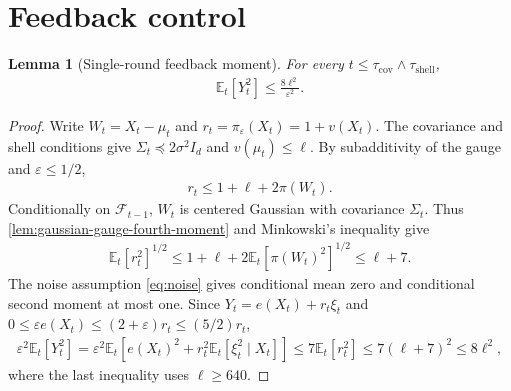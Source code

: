 \documentclass{article}
\newtheorem{lemma}[lemma]{Lemma}
\newcommand{\E}{\mathbb E}
\newcommand{\F}{\mathcal F}
\newcommand{\1}{\mathbf 1}
\newcommand{\eps}{\varepsilon}
\begin{document}
\section{Feedback control}
\label{app:feedback}
\begin{lemma}[Single-round feedback moment]
    \label{lem:single-round-feedback}
    For every $t\leq\tau_{\mathrm{cov}}\wedge\tau_{\mathrm{shell}}$,
    \begin{align}
        \E_t[Y_t^2]\leq\frac{8\ell^2}{\eps^2}.
        \label{eq:single-round-feedback}
    \end{align}
\end{lemma}
\begin{proof}
    Write $W_t=X_t-\mu_t$ and $r_t=\pi_\eps(X_t)=1+v(X_t)$.
    The covariance and shell conditions give
    $\Sigma_t\preceq2\sigma^2I_d$ and $v(\mu_t)\leq\ell$.
    By subadditivity of the gauge and $\eps\leq1/2$,
    \begin{align}
        r_t\leq1+\ell+2\pi(W_t).
    \end{align}
    Conditionally on $\F_{t-1}$, $W_t$ is centered Gaussian with
    covariance $\Sigma_t$. Thus
    \cref{lem:gaussian-gauge-fourth-moment} and Minkowski's inequality give
    \begin{align}
        \E_t[r_t^2]^{1/2}
        \leq1+\ell+2\E_t[\pi(W_t)^2]^{1/2}
        \leq\ell+7.
    \end{align}
    The noise assumption \eqref{eq:noise} gives conditional mean zero
    and conditional second moment at most one. Since
    $Y_t=e(X_t)+r_t\xi_t$ and
    $0\leq\eps e(X_t)\leq(2+\eps)r_t\leq(5/2)r_t$,
    \begin{align}
        \eps^2\E_t[Y_t^2]
        =\eps^2\E_t\left[e(X_t)^2+r_t^2\E_t[\xi_t^2\mid X_t]\right]
        \leq7\E_t[r_t^2]
        \leq7(\ell+7)^2
        \leq8\ell^2,
    \end{align}
    where the last inequality uses $\ell\geq640$.
\end{proof}
\end{document}
